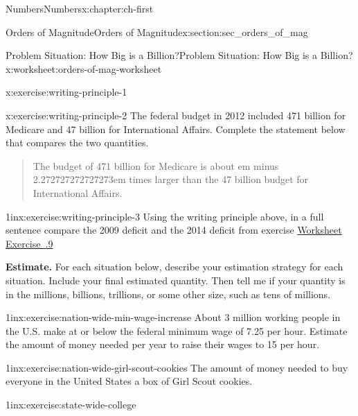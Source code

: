 \documentclass[twoside,10pt,]{book}
\newcommand{\xreffont}{\relax}
\newcommand{\fillin}[1]{\leavevmode\leaders\vrule height -1.2pt depth 1.5pt \hskip #1em minus #1em \null}
\numberwithin{equation}{chapter}
\begin{document}
\begin{chapterptx}{Numbers}{}{Numbers}{}{}{x:chapter:ch-first}
\begin{sectionptx}{Orders of Magnitude}{}{Orders of Magnitude}{}{}{x:section:sec_orders_of_mag}
\begin{worksheet-subsection-numberless}{Problem Situation: How Big is a Billion?}{}{Problem Situation: How Big is a Billion?}{}{}{x:worksheet:orders-of-mag-worksheet}
\begin{exercisegroup}
\begin{divisionexerciseeg}{10}{}{}{x:exercise:writing-principle-1}
\begin{enumerate}[label=(\alph*)]
\end{enumerate}
\end{divisionexerciseeg}%
%
\begin{divisionexerciseeg}{11}{}{}{x:exercise:writing-principle-2}%
The federal budget in 2012 included \textdollar{}471 billion for Medicare and \textdollar{}47 billion for International Affairs.  Complete the statement below that compares the two quantities. \begin{quote}%
The budget of \textdollar{}471 billion for Medicare is about \fillin{2.272727272727273} times larger than the \textdollar{}47 billion budget for International Affairs.%
\end{quote}
\end{divisionexerciseeg}%
\begin{divisionexerciseeg}{12}{}{1in}{x:exercise:writing-principle-3}%
Using the writing principle above, in a full sentence compare the 2009 deficit and the 2014 deficit from exercise \hyperlink{x:exercise:scientific-notation-2}{Worksheet Exercise~{\xreffont 1.2.9}}\end{divisionexerciseeg}%
\end{exercisegroup}
\par\medskip\noindent
\clearpage
\par\medskip\noindent%
\textbf{Estimate.}\space\space%
For each situation below, describe your estimation strategy for each situation.  Include your final estimated quantity.  Then tell me if your quantity is in the millions, billions, trillions, or some other size, such as tens of millions.\begin{exercisegroup}
\begin{divisionexerciseeg}{13}{}{1in}{x:exercise:nation-wide-min-wage-increase}%
About 3 million working people in the U.S. make at or below the federal minimum wage of \textdollar{}7.25 per hour.  Estimate the amount of money needed per year to raise their wages to \textdollar{}15 per hour.\end{divisionexerciseeg}%
\begin{divisionexerciseeg}{14}{}{1in}{x:exercise:nation-wide-girl-scout-cookies}%
The amount of money needed to buy everyone in the United States a box of Girl Scout cookies.\end{divisionexerciseeg}%
\begin{divisionexerciseeg}{15}{}{1in}{x:exercise:state-wide-college}%

\end{divisionexerciseeg}
\end{exercisegroup}
\end{worksheet-subsection-numberless}
\end{sectionptx}
\end{chapterptx}
\end{document}
